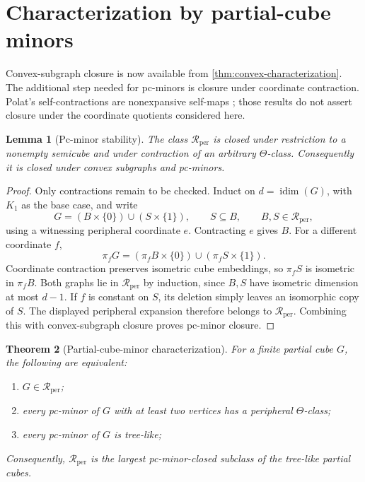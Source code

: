 \documentclass[11pt]{article}
\newtheorem{theorem}{Theorem}[section]
\newtheorem{lemma}[theorem]{Lemma}
\theoremstyle{definition}
\theoremstyle{remark}
\newcommand{\Rper}{\mathcal R_{\mathrm{per}}}
\newcommand{\idim}{\operatorname{idim}}
\begin{document}
\section{Characterization by partial-cube minors}
\label{sec:pcminor-characterization}
\label{sec:heredity}

Convex-subgraph closure is now available from
\cref{thm:convex-characterization}. The additional step needed for pc-minors
is closure under coordinate contraction. Polat's self-contractions are
nonexpansive self-maps \cite[Section~3]{Polat12treelike}; those results do
not assert closure under the coordinate quotients considered here.

\begin{lemma}[Pc-minor stability]
\label{lem:pcminor-closure}
The class \(\Rper\) is closed under restriction to a nonempty semicube and
under contraction of an arbitrary \(\Theta\)-class. Consequently it is
closed under convex subgraphs and pc-minors.
\end{lemma}

\begin{proof}
Only contractions remain to be checked. Induct on \(d=\idim(G)\), with
\(K_1\) as the base case, and write
\[
 G=(B\times\{0\})\cup(S\times\{1\}),\qquad S\subseteq B,
 \qquad B,S\in\Rper,
\]
using a witnessing peripheral coordinate \(e\). Contracting \(e\) gives
\(B\). For a different coordinate \(f\),
\[
 \pi_fG=(\pi_fB\times\{0\})\cup(\pi_fS\times\{1\}).
\]
Coordinate contraction preserves isometric cube embeddings, so \(\pi_fS\)
is isometric in \(\pi_fB\). Both graphs lie in \(\Rper\) by induction,
since \(B,S\) have isometric dimension at most \(d-1\). If \(f\) is
constant on \(S\), its deletion simply leaves an isomorphic copy of \(S\).
The displayed peripheral expansion therefore belongs to \(\Rper\).
Combining this with convex-subgraph closure proves pc-minor closure.
\end{proof}

\begin{theorem}[Partial-cube-minor characterization]
\label{thm:characterization}
For a finite partial cube \(G\), the following are equivalent:
\begin{enumerate}[label=\textup{(\roman*)}]
  \item \(G\in\Rper\);
  \item every pc-minor of \(G\) with at least two vertices has a peripheral
        \(\Theta\)-class;
  \item every pc-minor of \(G\) is tree-like;
\end{enumerate}
Consequently, \(\Rper\) is the largest pc-minor-closed subclass of the
tree-like partial cubes.
\end{theorem}
\end{document}
